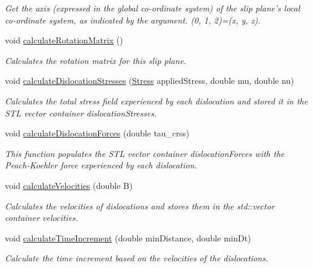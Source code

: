 \begin{DoxyCompactItemize}
\begin{DoxyCompactList}\small\item\em Get the axis (expressed in the global co-\/ordinate system) of the slip plane's local co-\/ordinate system, as indicated by the argument. (0, 1, 2)=(x, y, z). \end{DoxyCompactList}\item 
void \hyperlink{classSlipPlane_a5d9054f21be225f50860ad1351e3a86f}{calculate\-Rotation\-Matrix} ()
\begin{DoxyCompactList}\small\item\em Calculates the rotation matrix for this slip plane. \end{DoxyCompactList}\item 
void \hyperlink{classSlipPlane_a2d4d2d031502d4a6f0aebbad0990b882}{calculate\-Dislocation\-Stresses} (\hyperlink{classStress}{Stress} applied\-Stress, double mu, double nu)
\begin{DoxyCompactList}\small\item\em Calculates the total stress field experienced by each dislocation and stored it in the S\-T\-L vector container dislocation\-Stresses. \end{DoxyCompactList}\item 
void \hyperlink{classSlipPlane_ac16d1abbbc3b938b6f1f29a33a70212d}{calculate\-Dislocation\-Forces} (double tau\-\_\-crss)
\begin{DoxyCompactList}\small\item\em This function populates the S\-T\-L vector container dislocation\-Forces with the Peach-\/\-Koehler force experienced by each dislocation. \end{DoxyCompactList}\item 
void \hyperlink{classSlipPlane_aff7af69ba5235da6c8b142193509683c}{calculate\-Velocities} (double B)
\begin{DoxyCompactList}\small\item\em Calculates the velocities of dislocations and stores them in the std\-::vector container velocities. \end{DoxyCompactList}\item 
void \hyperlink{classSlipPlane_a5418245f8c716d4a35405d68db53bc66}{calculate\-Time\-Increment} (double min\-Distance, double min\-Dt)
\begin{DoxyCompactList}\small\item\em Calculate the time increment based on the velocities of the dislocations. \end{DoxyCompactList}\end{DoxyCompactItemize}
